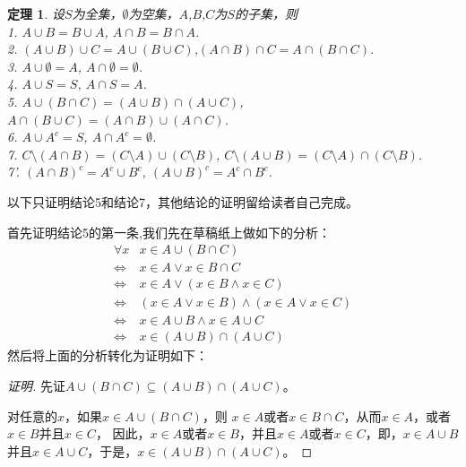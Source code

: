 \documentclass{book}[oneside]
\newtheorem{Thm}{定理}[chapter]
\begin{document}
\begin{CJK*}{UTF8}{gbsn}
\begin{Thm}
设$S$为全集，$\emptyset$为空集，$A$,$B$,$C$为$S$的子集，则\\
1. $A \cup B = B \cup A$, $A \cap B = B \cap A$.\\
2. $(A \cup B) \cup C = A \cup (B \cup C)$,$(A \cap B) \cap C = A \cap (B \cap C)$.\\
3. $A \cup \emptyset = A$, $A \cap \emptyset = \emptyset$.\\
4. $A \cup S = S$, $A \cap S = A$.\\
5. $A \cup (B \cap C) = (A \cup B) \cap (A \cup C)$, $A \cap (B \cup C) = (A \cap B) \cup (A \cap C)$.\\
6. $A \cup A^c = S$, $A \cap A^c = \emptyset$.\\
7. $C \setminus (A \cap B) = (C \setminus A) \cup (C \setminus B)$, $C\setminus (A \cup B) = (C \setminus A) \cap (C \setminus B)$.\\ 
7'.  $(A \cap B)^c = A^c \cup B^c$, $(A \cup B)^c = A^c \cap B^c$.\\
\end{Thm}
  以下只证明结论5和结论7，其他结论的证明留给读者自己完成。

  首先证明结论5的第一条,我们先在草稿纸上做如下的分析：
  \begin{equation*}
    \begin{split}
      \forall x &x \in A \cup (B \cap C)\\
      \Leftrightarrow& x \in A \lor x \in B \cap C\\
      \Leftrightarrow& x \in A \lor (x \in B \land x \in C)\\
      \Leftrightarrow& (x \in A \lor x \in B) \land (x \in A \lor x \in C)\\
      \Leftrightarrow& x \in A \cup B \land x \in A \cup C\\
      \Leftrightarrow& x \in (A \cup B) \cap (A \cup C)
    \end{split}
  \end{equation*}
  然后将上面的分析转化为证明如下：  
\begin{proof}[证明]
  先证$A \cup (B \cap C) \subseteq (A \cup B) \cap (A \cup C)$。

  对任意的$x$，如果$x \in A \cup (B \cap C)$，则 $x \in A$或者$x \in B \cap C$，从而$x \in A$，或者$x \in B$并且$ x \in C$，
  因此，$x \in A$或者$x \in B$，并且$x \in A$或者$ x \in C$，即，$x \in A \cup B$ 并且$x \in A \cup C$，于是，$x \in (A \cup B) \cap (A \cup C)$。


\end{proof}
\end{CJK*}
\end{document}
